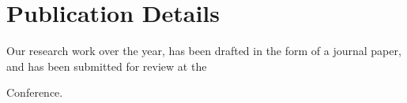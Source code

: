 \chapter{Publication Details}

Our research work over the year, has been drafted in the form of a journal
paper, and has been submitted for review at the 

Conference. 

